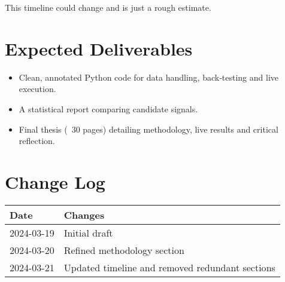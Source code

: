 \documentclass[a4paper,12pt]{article}
\begin{document}
This timeline could change and is just a rough estimate.

\section{Expected Deliverables}

\begin{itemize}
  \item Clean, annotated Python code for data handling, back‑testing and
        live execution.
  \item A statistical report comparing candidate signals.
  \item Final thesis (~30 pages) detailing methodology, live results and
        critical reflection.
\end{itemize}

\section*{Change Log}

\begin{tabular}{ll}
\toprule
\textbf{Date} & \textbf{Changes} \\
\midrule
2024-03-19 & Initial draft \\
2024-03-20 & Refined methodology section \\
2024-03-21 & Updated timeline and removed redundant sections \\
\bottomrule
\end{tabular}
\end{document}
